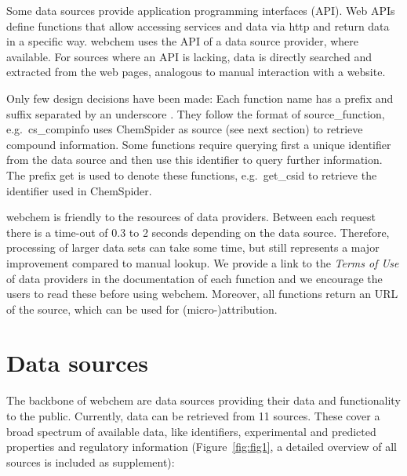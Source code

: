 Some data sources provide application programming interfaces (API).
Web APIs define functions that allow accessing services and data via http and return data in a specific way.
webchem uses the API of a data source provider, where available.
For sources where an API is lacking, data is directly searched and extracted from the web pages, analogous to manual interaction with a website.

Only few design decisions have been made:
Each function name has a prefix and suffix separated by an underscore \citep{Chamberlain_Szocs_2013}.
They follow the format of source\_function, e.g.\ cs\_compinfo uses ChemSpider as source (see next section) to retrieve compound information.
Some functions require querying first a unique identifier from the data source and then use this identifier to query further information.
The prefix get is used to denote these functions, e.g.\ get\_csid to retrieve the identifier used in ChemSpider.

webchem is friendly to the resources of data providers. 
Between each request there is a time-out of 0.3 to 2 seconds depending on the data source. 
Therefore, processing of larger data sets can take some time, but still represents a major improvement compared to manual lookup.
We provide a link to the \emph{Terms of Use} of data providers in the documentation of each function and we encourage the users to read these before using webchem.
Moreover, all functions return an URL of the source, which can be used for \mbox{(micro-)attribution}.


\section[Data sources]{Data sources}
The backbone of webchem are data sources providing their data and functionality to the public.
Currently, data can be retrieved from 11 sources.
These cover a broad spectrum of available data, like identifiers, experimental and predicted properties and regulatory information (Figure~\ref{fig:fig1}, a detailed overview of all sources is included as supplement):

\clearpage

